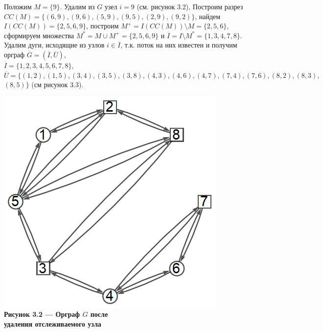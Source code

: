 \documentclass[14pt]{extarticle}%
\begin{document}
Положим $M=\{9\}$. Удалим из $G$ узел $i=9$ (см. рисунок 3.2), Построим разрез $CC(M)=\{(6,9),(9,6),(5,9),(9,5),(2,9),(9,2)\}$, найдем $I(CC(M))=\{2,5,6,9\}$, построим $M^+=I(CC(M))\setminus M=\{2,5,6\}$, сформируем множества $M^*=M\cup M^+=\{2,5,6,9\}$ и $\overline{I}=I\setminus M^*=\{1,3,4,7,8\}$. Удалим дуги, исходящие из узлов $i\in \overline{I}$, т.к. поток на них известен и получим орграф $\overline{G}=(\overline{I},\overline{U})$,\\ $\overline{I}=\{1,2,3,4,5,6,7,8\}$,\\ $\overline{U}=\{(1,2),(1,5),(3,4),(3,5),(3,8),(4,3),(4,6),(4,7),(7,4),(7,6),(8,2),(8,3),$ \\ $(8,5)\}$ (см рисунок 3.3).
\begin{center}
\includegraphics[scale=0.5]{grs/s1g1.png}\\
\textbf{Рисунок 3.2 --- Орграф $G$ после \\удаления отслеживаемого узла}
\end{center}
\end{document}
